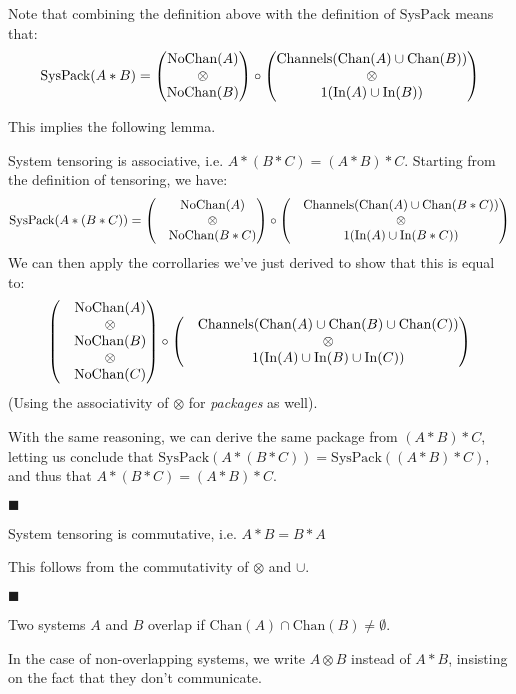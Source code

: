 Note that combining the definition above with the definition of $\text{SysPack}$
means that:
$$
\text{SysPack}(A * B) =
\begin{pmatrix}
\text{NoChan}(A)\cr
\otimes\cr
\text{NoChan}(B)\cr
\end{pmatrix}
\circ
\begin{pmatrix}
\text{Channels}(\text{Chan}(A) \cup \text{Chan}(B))\cr
\otimes\cr
1(\text{In}(A) \cup \text{In}(B))\cr
\end{pmatrix}
$$

This implies the following lemma.

\begin{lemma}
System tensoring is associative, i.e. $A * (B * C) = (A * B) * C$.
 Starting from the definition of tensoring, we have:
$$
\text{SysPack}(A * (B * C)) =
\begin{pmatrix}
&\text{NoChan}(A)\cr
&\otimes\cr
&\text{NoChan}(B * C)\cr
\end{pmatrix}
\circ
\begin{pmatrix}
&\text{Channels}(\text{Chan}(A) \cup \text{Chan}(B * C))\cr
&\otimes\cr
&1(\text{In}(A) \cup \text{In}(B * C))\cr
\end{pmatrix}
$$
We can then apply the corrollaries we've just derived to show that this
is equal to:
$$
\begin{pmatrix}
&\text{NoChan}(A)\cr
&\otimes\cr
&\text{NoChan}(B)\cr
&\otimes\cr
&\text{NoChan}(C)\cr
\end{pmatrix}
\circ
\begin{pmatrix}
  &\text{Channels}(\text{Chan}(A) \cup \text{Chan}(B) \cup \text{Chan}(C))\cr
&\otimes\cr
  &1(\text{In}(A) \cup \text{In}(B) \cup \text{In}(C))\cr
\end{pmatrix}
$$
(Using the associativity of $\otimes$ for \emph{packages} as well).

With the same reasoning, we can derive the same package from $(A * B) * C$,
letting us conclude that $\text{SysPack}(A * (B * C)) = \text{SysPack}((A * B) * C)$,
and thus that $A * (B * C) = (A * B) * C$.

$\blacksquare$
\end{lemma}

\begin{lemma}
System tensoring is commutative, i.e. $A * B = B * A$

 This follows from the commutativity of $\otimes$ and $\cup$.

$\blacksquare$
\end{lemma}

\begin{definition}
Two systems $A$ and $B$ overlap if $\text{Chan}(A) \cap \text{Chan}(B) \neq \emptyset$.

In the case of non-overlapping systems, we write $A \otimes B$ instead of $A * B$,
insisting on the fact that they don't communicate.
\end{definition}

